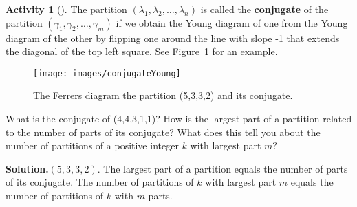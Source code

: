 \documentclass[10pt,]{book}
\newcommand{\terminology}[1]{\textbf{#1}}
\theoremstyle{plain}
\theoremstyle{definition}
\newtheorem{activity}[project]{Activity}
\numberwithin{equation}{chapter}
\begin{document}
\begin{activity}[]\label{activity-87}
The partition \((\lambda_1,\lambda_2,\ldots, \lambda_n)\) is called the \terminology{conjugate} of the partition \((\gamma_1,\gamma_2,\ldots, \gamma_m)\) if we obtain the Young diagram of one from the Young diagram of the other by flipping one around the line with slope -1 that extends the diagonal of the top left square. See \hyperref[conjugateYoung]{Figure~\ref{conjugateYoung}} for an example.%
\begin{figure}
\centering
\texttt{[image: images/conjugateYoung]}
\caption{The Ferrers diagram the partition (5,3,3,2) and its conjugate.\label{conjugateYoung}}
\end{figure}
What is the conjugate of (4,4,3,1,1)? How is the largest part of a partition related to the number of parts of its conjugate? What does this tell you about the number of partitions of a positive integer \(k\) with largest part \(m\)?%
\par\medskip\noindent%
\textbf{Solution.}\quad \((5,3,3,2)\). The largest part of a partition equals the number of parts of its conjugate. The number of partitions of \(k\) with largest part \(m\) equals the number of partitions of \(k\) with \(m\) parts.%
\end{activity}
\end{document}
